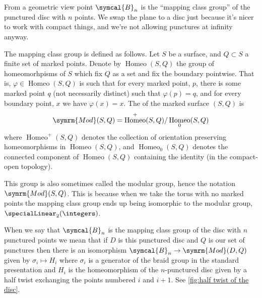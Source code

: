 \documentclass[fleqn]{NotesClass}
\newcommand{\braid}{\symcal{B}}
\DeclareMathOperator{\Homeo}{Homeo}
\begin{document}
    \begin{remark}{}{}
        From a geometric view point \(\braid_n\) is the \enquote{mapping class group} of the punctured disc with \(n\) points.
        We swap the plane to a disc just because it's nicer to work with compact things, and we're not allowing punctures at infinity anyway.
        
        The mapping class group is defined as follows.
        Let \(S\) be a surface, and \(Q \subset S\) a finite set of marked points.
        Denote by \(\Homeo(S, Q)\) the group of homeomorhpisms of \(S\) which fix \(Q\) as a set and fix the boundary pointwise.
        That is, \(\varphi \in \Homeo(S, Q)\) is such that for every marked point, \(p\), there is some marked point \(q\) (not necessarily distinct) such that \(\varphi(p) = q\), and for every boundary point, \(x\) we have \(\varphi(x) = x\).
        The  of the marked surface \((S, Q)\) is
        \begin{equation}
            \symrm{Mod}(S, Q) = \Homeo^+(S, Q) / \Homeo_0(S, Q)
        \end{equation}
        where \(\Homeo^+(S, Q)\) denotes the collection of orientation preserving homeomorphisms in \(\Homeo(S, Q)\), and \(\Homeo_0(S, Q)\) denotes the connected component of \(\Homeo(S, Q)\) containing the identity (in the compact-open topology).
        
        This group is also sometimes called the modular group, hence the notation \(\symrm{Mod}(S, Q)\).
        This is because when we take the torus with no marked points the mapping class group ends up being isomorphic to the modular group, \(\specialLinear_2(\integers)\).
        
        When we say that \(\braid_n\) is the mapping class group of the disc with \(n\) punctured points we mean that if \(D\) is this punctured disc and \(Q\) is our set of punctures then there is an isomorphism \(\braid_n \to \symrm{Mod}(D, Q)\) given by \(\sigma_i \mapsto H_i\) where \(\sigma_i\) is a generator of the braid group in the standard presentation and \(H_i\) is the homeomorphism of the \(n\)-punctured disc given by a half twist exchanging the points numbered \(i\) and \(i + 1\).
        See \cref{fig:half twist of the disc}.
    \end{remark}
    
\end{document}
